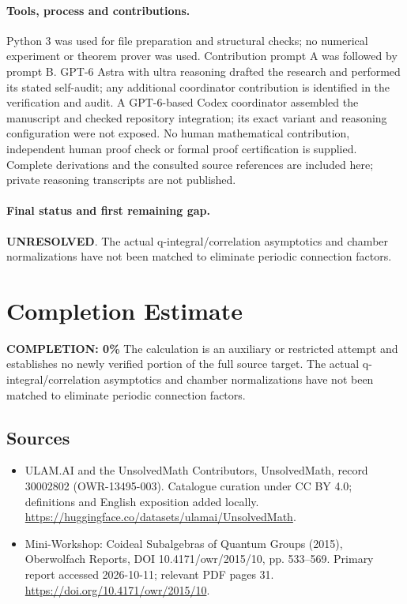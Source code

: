 \documentclass[11pt]{article}
\begin{document}
\paragraph{Tools, process and contributions.}
Python 3 was used for file preparation and structural checks; no numerical experiment or theorem prover was used. Contribution prompt A was followed by prompt B. GPT-6 Astra with ultra reasoning drafted the research and performed its stated self-audit; any additional coordinator contribution is identified in the verification and audit. A GPT-6-based Codex coordinator assembled the manuscript and checked repository integration; its exact variant and reasoning configuration were not exposed. No human mathematical contribution, independent human proof check or formal proof certification is supplied. Complete derivations and the consulted source references are included here; private reasoning transcripts are not published.

\paragraph{Final status and first remaining gap.}
\textbf{UNRESOLVED}. The actual q-integral/correlation asymptotics and chamber normalizations have not been matched to eliminate periodic connection factors.

\section{Completion Estimate}
\noindent\textbf{COMPLETION: 0\%}
The calculation is an auxiliary or restricted attempt and establishes no newly verified portion of the full source target. The actual q-integral/correlation asymptotics and chamber normalizations have not been matched to eliminate periodic connection factors.

\subsection{Sources}
\begin{itemize}
\item[\hypertarget{source:30002802:1}{S1}] ULAM.AI and the UnsolvedMath Contributors, UnsolvedMath, record 30002802 (OWR-13495-003). Catalogue curation under CC BY 4.0; definitions and English exposition added locally.
\url{https://huggingface.co/datasets/ulamai/UnsolvedMath}.
\item[\hypertarget{source:30002802:2}{S2}] Mini-Workshop: Coideal Subalgebras of Quantum Groups (2015), Oberwolfach Reports, DOI 10.4171/owr/2015/10, pp. 533--569. Primary report accessed 2026-10-11; relevant PDF pages 31.
\url{https://doi.org/10.4171/owr/2015/10}.
\end{itemize}
\label{end:30002802}
\end{document}
